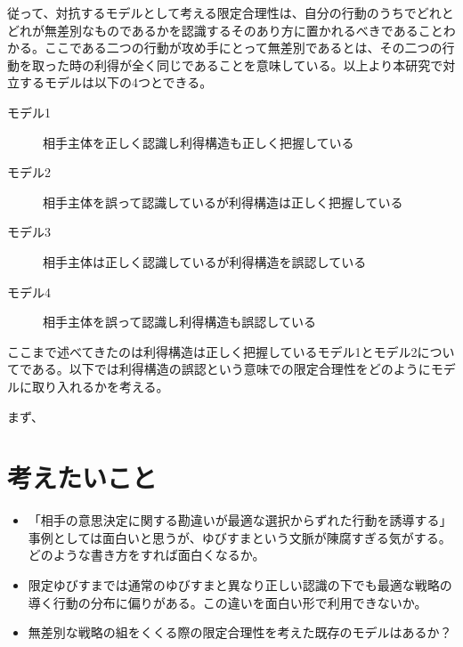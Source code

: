 \documentclass{jsarticle}
\begin{document}
従って、対抗するモデルとして考える限定合理性は、自分の行動のうちでどれとどれが無差別なものであるかを認識するそのあり方に置かれるべきであることわかる。ここである二つの行動が攻め手にとって無差別であるとは、その二つの行動を取った時の利得が全く同じであることを意味している。以上より本研究で対立するモデルは以下の4つとできる。

\begin{description}
	\item[モデル1] 相手主体を正しく認識し利得構造も正しく把握している
	\item[モデル2] 相手主体を誤って認識しているが利得構造は正しく把握している
	\item[モデル3] 相手主体は正しく認識しているが利得構造を誤認している
	\item[モデル4] 相手主体を誤って認識し利得構造も誤認している
\end{description}

ここまで述べてきたのは利得構造は正しく把握しているモデル1とモデル2についてである。以下では利得構造の誤認という意味での限定合理性をどのようにモデルに取り入れるかを考える。

まず、



\section{考えたいこと}
\begin{itemize}
	\item 「相手の意思決定に関する勘違いが最適な選択からずれた行動を誘導する」事例としては面白いと思うが、ゆびすまという文脈が陳腐すぎる気がする。どのような書き方をすれば面白くなるか。
	\item 限定ゆびすまでは通常のゆびすまと異なり正しい認識の下でも最適な戦略の導く行動の分布に偏りがある。この違いを面白い形で利用できないか。
	\item 無差別な戦略の組をくくる際の限定合理性を考えた既存のモデルはあるか？
\end{itemize}
\end{document}

